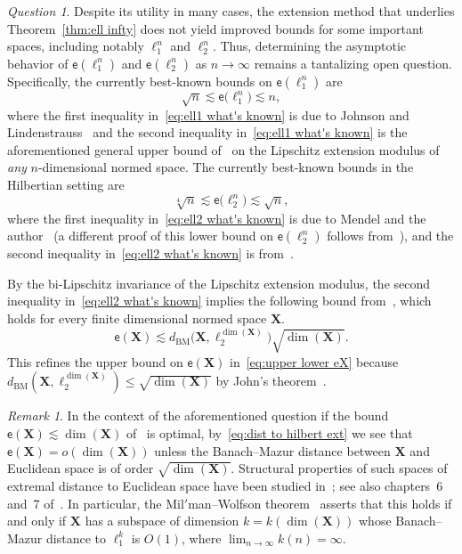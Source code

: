 \documentclass[11pt,reqno]{amsart}
\renewcommand{\le}{\leqslant}
\def\cprime{$'$}
\newcommand{\X}{\mathbf X}
\theoremstyle{remark}
\newtheorem{remark}[theorem]{Remark}
\newtheorem{question}[theorem]{Question}
\newcommand{\BM}{\mathrm{BM}}
\newcommand{\ee}{\mathsf{e}}
\renewcommand{\1}{\mathbf 1}
\def\cprime{$'$}
\begin{document}
\begin{question}
Despite its utility in many cases, the extension method that underlies Theorem~\ref{thm:ell infty} does not yield improved bounds for some important spaces, including notably $\ell_1^n$ and $\ell_2^n$. Thus, determining the asymptotic behavior of $\ee(\ell_1^n)$ and $\ee(\ell_2^n)$ as $n\to \infty$ remains a tantalizing open question. Specifically, the currently best-known bounds on $\ee(\ell_1^n)$ are
\begin{equation}\label{eq:ell1 what's known}
\sqrt{n}\lesssim \ee\big(\ell_1^n\big)\lesssim n,
\end{equation}
where the first inequality in~\eqref{eq:ell1 what's known} is due to Johnson and Lindenstrauss~\cite{JL84} and the second inequality in~\eqref{eq:ell1 what's known} is the aforementioned general upper bound of~\cite{JLS86} on the Lipschitz extension modulus of {\em any} $n$-dimensional normed space.  The currently best-known bounds in the Hilbertian setting  are
\begin{equation}\label{eq:ell2 what's known}
\sqrt[4]{n}\lesssim \ee\big(\ell_2^n\big)\lesssim \sqrt{n},
\end{equation}
where the first inequality in~\eqref{eq:ell2 what's known}  is due to Mendel and the author~\cite{MN13-bary} (a different proof of this lower bound on $\ee(\ell_2^n)$ follows from~\cite{Nao20-almost}), and the second inequality in~\eqref{eq:ell2 what's known}  is from~\cite{LN05}.
\end{question}


By the bi-Lipschitz invariance of the Lipschitz extension modulus,  the second inequality in~\eqref{eq:ell2 what's known} implies  the following bound from~\cite{LN05}, which holds for every finite dimensional normed space $\X$.
\begin{equation}\label{eq:dist to hilbert ext}
\ee(\X)\lesssim d_{\BM}\big(\X,\ell_2^{\dim(\X)}\big) \sqrt{\dim(\X)}.
\end{equation}
This refines the  upper bound on $\ee(\X)$ in~\eqref{eq:upper lower eX} because $d_{\BM}(\X,\ell_2^{\dim(\X)})\le \sqrt{\dim(\X)}$ by John's theorem~\cite{Joh48}.

\begin{remark} In the context of the aforementioned question if  the bound $\ee(\X)\lesssim \dim(\X)$ of~\cite{JLS86} is optimal, by~\eqref{eq:dist to hilbert ext} we see that $\ee(\X)=o(\dim(\X))$ unless the Banach--Mazur distance between $\X$ and Euclidean space is of order $\sqrt{\dim(\X)}$. Structural properties of such spaces of extremal distance to Euclidean space have been studied in~\cite{MW78,Pis78-extremal,Bou81-Pl,JS82-maximal,ATTJ05}; see also chapters~6 and~7 of~\cite{Tom89}. In particular, the Mil{\cprime}man--Wolfson theorem~\cite{MW78} asserts that this holds if and only if $\X$ has a subspace of dimension $k=k(\dim (\X))$ whose Banach--Mazur distance to $\ell_1^k$ is $O(1)$, where $\lim_{n\to \infty} k(n)=\infty$.
\end{remark}
\end{document}
